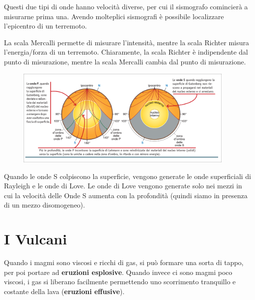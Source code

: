 \documentclass[a4paper]{article}
\begin{document}
Questi due tipi di onde hanno velocità diverse, per cui il sismografo comincierà a misurarne
prima una.
Avendo molteplici sismografi è possibile localizzare l'epicentro di un terremoto.

La scala Mercalli permette di misurare l'intensità, mentre la scala Richter misura l'energia/forza di un terremoto.
Chiaramente, la scala Richter è indipendente dal punto di misurazione, mentre la scala Mercalli cambia dal punto di misurazione.

\begin{center}
\begin{figure}[h]
    \centering
    \includegraphics[width=0.95\textwidth]{./onde_terremoto.png}
\end{figure}
\end{center}

Quando le onde S colpiscono la superficie, vengono generate
le onde superficiali di Rayleigh e le onde di Love. Le onde di Love
vengono generate solo nei mezzi in cui la velocità delle
Onde S aumenta con la profondità (quindi siamo in presenza di un mezzo disomogeneo).

\pagebreak

\section{I Vulcani}


Quando i magmi sono viscosi e ricchi di gas, si può formare una sorta di tappo,
per poi portare ad \textbf{eruzioni esplosive}.
Quando invece ci sono magmi poco viscosi, i gas si liberano facilmente
permettendo uno scorrimento tranquillo e costante della lava (\textbf{eruzioni effusive}).

\end{document}
